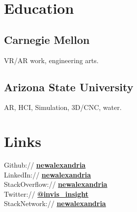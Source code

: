 \documentclass[letterpaper]{deedy-resume} %
\begin{document}
\begin{minipage}[t]{0.33\textwidth} %


\section{Education} 


\subsection{Carnegie Mellon}

VR/AR work, engineering arts.

\sectionspace %


\subsection{Arizona State University}
AR, HCI, Simulation, 3D/CNC, water.

\sectionspace %


\section{Links} 

Github:// \href{https://github.com/NewAlexandria}{\bf newalexandria} \\
LinkedIn:// \href{https://linkedin.com/in/newalexandria}{\bf newalexandria} \\
StackOverflow:// \href{https://stackoverflow.com/story/newalexandria}{\bf newalexandria} \\
Twitter:// \href{https://twitter.com/invis_insight}{\bf @invis\_insight} \\
StackNetwork:// \href{https://stackexchange.com/users/97237/new-alexandria?tab=accounts}{\bf newalexandria}


\end{minipage}
\end{document}
